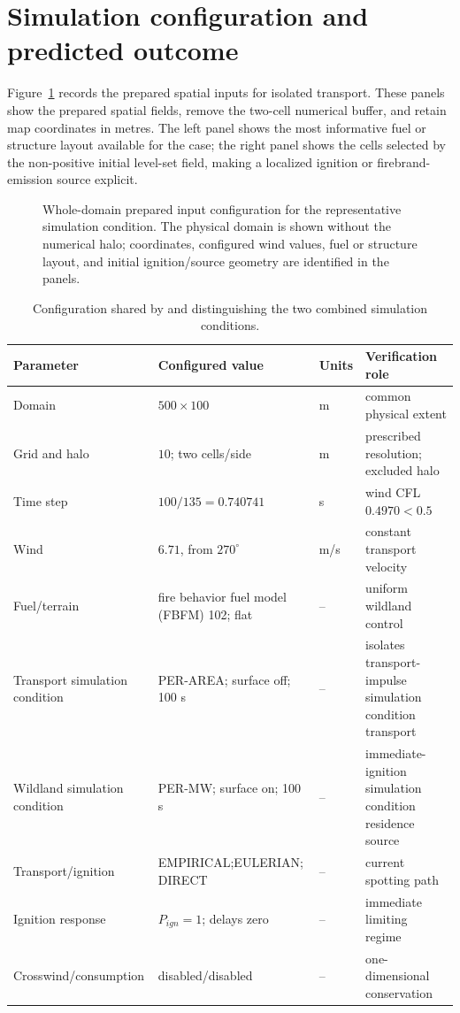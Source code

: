 \section{Simulation configuration and predicted outcome}

Figure~\ref{fig:input-configuration} records the prepared spatial inputs for isolated transport.
These panels show the prepared spatial fields, remove the
two-cell numerical buffer, and retain map coordinates in metres.  The left panel shows
the most informative fuel or structure layout available for the case; the right panel
shows the cells selected by the non-positive initial level-set field, making a localized
ignition or firebrand-emission source explicit.

\begin{figure}[H]
\centering
{}
\caption{Whole-domain prepared input configuration for the representative simulation condition.  The
physical domain is shown without the numerical halo; coordinates, configured wind values,
fuel or structure layout, and initial ignition/source geometry are identified in the panels.}
\label{fig:input-configuration}
\end{figure}

\begin{table}[!htbp]\centering\small
\begin{tabular}{p{}p{}p{}p{}}
\toprule Parameter & Configured value & Units & Verification role\\ \midrule
Domain & $500\times100$ & m & common physical extent\\
Grid and halo & $10$; two cells/side & m & prescribed resolution; excluded halo\\
Time step & $100/135=0.740741$ & s & wind CFL $0.4970<0.5$\\
Wind & $6.71$, from $270^\circ$ & m/s & constant transport velocity\\
Fuel/terrain & fire behavior fuel model (FBFM) 102; flat & -- & uniform wildland control\\
Transport simulation condition & PER-AREA; surface off; 100 s & -- & isolates transport-impulse simulation condition transport\\
Wildland simulation condition & PER-MW; surface on; 100 s & -- & immediate-ignition simulation condition residence source\\
Transport/ignition & EMPIRICAL;\newline EULERIAN; DIRECT & -- & current spotting path\\
Ignition response & $P_{ign}=1$; delays zero & -- & immediate limiting regime\\
Crosswind/consumption & disabled/disabled & -- & one-dimensional conservation\\
\bottomrule
\end{tabular}
\caption{Configuration shared by and distinguishing the two combined simulation conditions.}
\end{table}
\FloatBarrier

